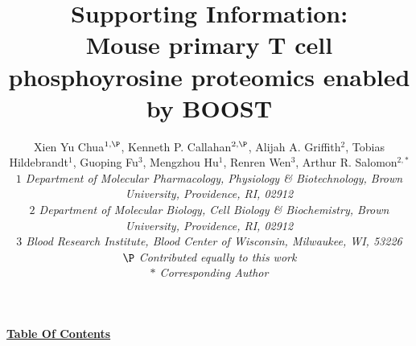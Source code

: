 \documentclass[journal=jprobs,manuscript=article]{achemso}
\title{Supporting Information:  \\Mouse primary T cell phosphoyrosine proteomics enabled by BOOST}
\author{Xien Yu Chua$^{1,\P}$, Kenneth P. Callahan$^{2,\P}$, Alijah A. Griffith$^{2}$, Tobias Hildebrandt$^{1}$, Guoping Fu$^{3}$, Mengzhou Hu$^{1}$, Renren Wen$^{3}$, Arthur R. Salomon$^{2,*}$
\\
\singlespacing
\textit{\small{$1$ Department of Molecular Pharmacology, Physiology \& Biotechnology, Brown University, Providence, RI, 02912}}
\\
\textit{\small{$2$ Department of Molecular Biology, Cell Biology \& Biochemistry, Brown University, Providence, RI, 02912}}
\\
\textit{\small{$3$ Blood Research Institute, Blood Center of Wisconsin, Milwaukee, WI, 53226}}
\\
\textit{\small{$\P$ Contributed equally to this work}}
\\
\textit{\small{$*$} Corresponding Author}\tiny}
\begin{document}
\thispagestyle{firststyle}
\newpage
\begin{center}
\textbf{\underline{\large{Table Of Contents}}}
\end{center}

%
%
\setcounter{page}{1}
\end{document}
